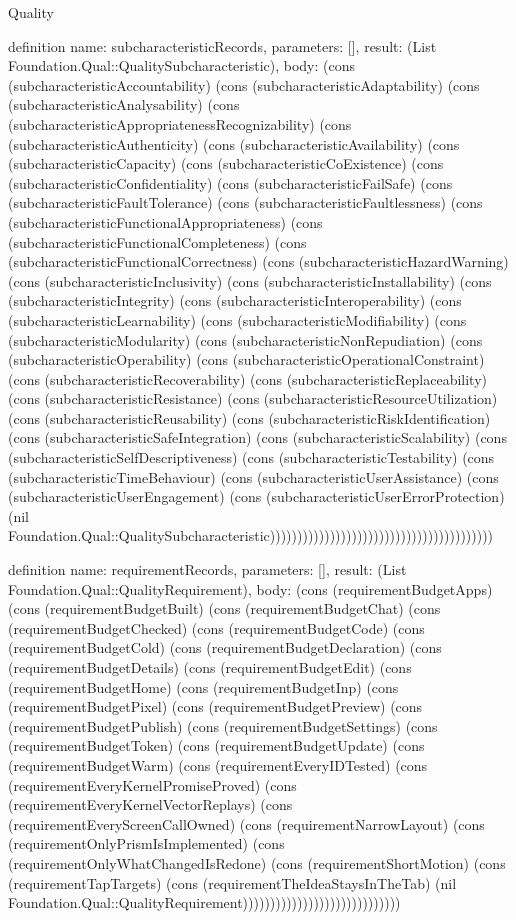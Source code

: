 \begin{lexlean}{Quality}
\begin{semanticmodule}
definition{
  name: subcharacteristicRecords,
  parameters: [],
  result: (List Foundation.Qual::QualitySubcharacteristic),
  body: (cons (subcharacteristicAccountability) (cons (subcharacteristicAdaptability) (cons (subcharacteristicAnalysability) (cons (subcharacteristicAppropriatenessRecognizability) (cons (subcharacteristicAuthenticity) (cons (subcharacteristicAvailability) (cons (subcharacteristicCapacity) (cons (subcharacteristicCoExistence) (cons (subcharacteristicConfidentiality) (cons (subcharacteristicFailSafe) (cons (subcharacteristicFaultTolerance) (cons (subcharacteristicFaultlessness) (cons (subcharacteristicFunctionalAppropriateness) (cons (subcharacteristicFunctionalCompleteness) (cons (subcharacteristicFunctionalCorrectness) (cons (subcharacteristicHazardWarning) (cons (subcharacteristicInclusivity) (cons (subcharacteristicInstallability) (cons (subcharacteristicIntegrity) (cons (subcharacteristicInteroperability) (cons (subcharacteristicLearnability) (cons (subcharacteristicModifiability) (cons (subcharacteristicModularity) (cons (subcharacteristicNonRepudiation) (cons (subcharacteristicOperability) (cons (subcharacteristicOperationalConstraint) (cons (subcharacteristicRecoverability) (cons (subcharacteristicReplaceability) (cons (subcharacteristicResistance) (cons (subcharacteristicResourceUtilization) (cons (subcharacteristicReusability) (cons (subcharacteristicRiskIdentification) (cons (subcharacteristicSafeIntegration) (cons (subcharacteristicScalability) (cons (subcharacteristicSelfDescriptiveness) (cons (subcharacteristicTestability) (cons (subcharacteristicTimeBehaviour) (cons (subcharacteristicUserAssistance) (cons (subcharacteristicUserEngagement) (cons (subcharacteristicUserErrorProtection) (nil Foundation.Qual::QualitySubcharacteristic)))))))))))))))))))))))))))))))))))))))))
}

definition{
  name: requirementRecords,
  parameters: [],
  result: (List Foundation.Qual::QualityRequirement),
  body: (cons (requirementBudgetApps) (cons (requirementBudgetBuilt) (cons (requirementBudgetChat) (cons (requirementBudgetChecked) (cons (requirementBudgetCode) (cons (requirementBudgetCold) (cons (requirementBudgetDeclaration) (cons (requirementBudgetDetails) (cons (requirementBudgetEdit) (cons (requirementBudgetHome) (cons (requirementBudgetInp) (cons (requirementBudgetPixel) (cons (requirementBudgetPreview) (cons (requirementBudgetPublish) (cons (requirementBudgetSettings) (cons (requirementBudgetToken) (cons (requirementBudgetUpdate) (cons (requirementBudgetWarm) (cons (requirementEveryIDTested) (cons (requirementEveryKernelPromiseProved) (cons (requirementEveryKernelVectorReplays) (cons (requirementEveryScreenCallOwned) (cons (requirementNarrowLayout) (cons (requirementOnlyPrismIsImplemented) (cons (requirementOnlyWhatChangedIsRedone) (cons (requirementShortMotion) (cons (requirementTapTargets) (cons (requirementTheIdeaStaysInTheTab) (nil Foundation.Qual::QualityRequirement)))))))))))))))))))))))))))))
}


\end{semanticmodule}
\end{lexlean}
